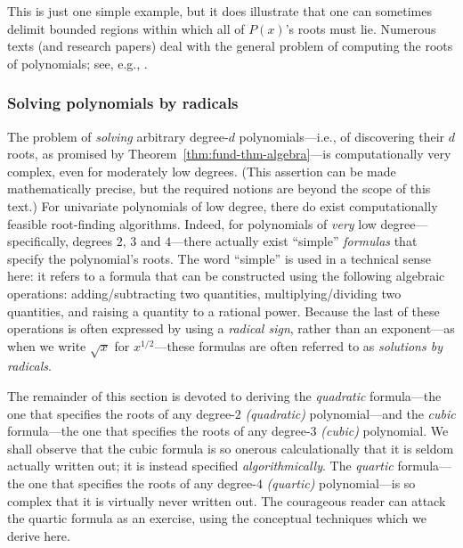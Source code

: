 \medskip

This is just one simple example, but it does illustrate that one can
sometimes delimit bounded regions within which all of $P(x)$'s roots
must lie.  Numerous texts (and research papers) deal with the general
problem of computing the roots of polynomials; see, e.g.,
\cite{MacDuffee}.


\subsubsection{Solving polynomials by radicals}
\label{sec:poly-by-radical}

The problem of {\it solving} arbitrary degree-$d$ polynomials---i.e.,
of discovering their $d$ roots, as promised by
Theorem~\ref{thm:fund-thm-algebra}---is computationally very complex,
even for moderately low degrees.  (This assertion can be made
mathematically precise, but the required notions are beyond the scope
of this text.)  For univariate polynomials of low degree, there do
exist computationally feasible root-finding algorithms.  Indeed, for
polynomials of {\em very} low degree---specifically, degrees $2$, $3$
and $4$---there actually exist ``simple'' {\em formulas} that specify
the polynomial's roots.  The word ``simple'' is used in a technical
sense here: it refers to a formula that can be constructed using the
following algebraic operations: adding/subtracting two quantities,
multiplying/dividing two quantities, and raising a quantity to a
rational power.  Because the last of these operations is often
expressed by using a {\em radical sign},  rather
than an exponent---as when we write $\sqrt{x}$ for
$x^{1/2}$---these formulas are often referred to as {\it solutions
  by radicals}.  

The remainder of this section is devoted to deriving the {\em
  quadratic} formula---the one that specifies the roots of any
degree-$2$ {\it (quadratic)} 
polynomial---and the {\em cubic} formula---the one that specifies the
roots of any degree-$3$ {\it (cubic)} polynomial.
 We shall observe that the cubic
formula is so onerous calculationally that it is seldom actually
written out; it is instead specified {\em algorithmically}.  The {\em
  quartic} formula---the one that specifies the roots of any
degree-$4$ {\it (quartic)}  polynomial---is
so complex that it is virtually never written out.  The courageous
reader can attack the quartic formula as an exercise, using the
conceptual techniques which we derive here.

